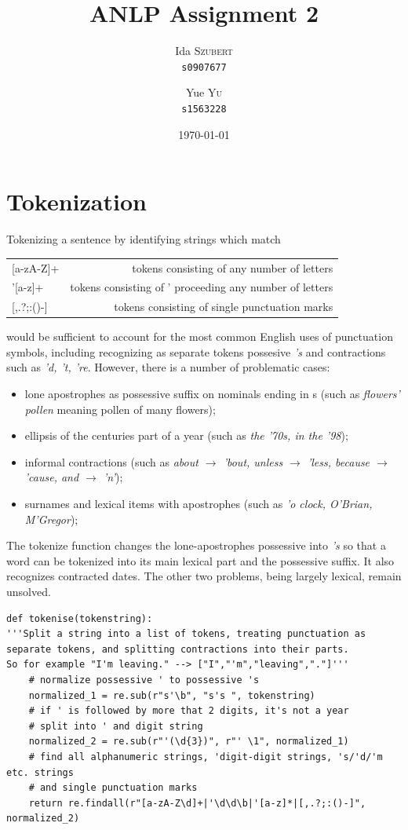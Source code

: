 \documentclass{article}
\title{ANLP Assignment 2} %
\author{
	Ida \textsc{Szubert}\\
	\texttt{s0907677}
	\and
	Yue \textsc{Yu}\\
	\texttt{s1563228}
}
\date{\today} %
\begin{document}
\section{Tokenization}

Tokenizing a sentence by identifying strings which match

\begin{center}
\begin{tabular}{l r}
	{[}a-zA-Z{]}+&tokens consisting of any number of letters\\
	'[a-z]+&tokens consisting of ' proceeding any number of letters\\
	{[},.?;:()-{]}&tokens consisting of single punctuation marks\\
\end{tabular}
\end{center}
would be sufficient to account for the most common English uses of punctuation symbols, including recognizing as separate tokens possesive \emph{'s} and contractions such as \emph{'d, 't, 're}.  However, there is a number of problematic cases:

\begin{itemize}
	\item
	lone apostrophes as possessive suffix on nominals ending in s (such as \emph{flowers' pollen} meaning pollen of many flowers);
	\item
	ellipsis of the centuries part of a year (such as \emph{the '70s, in the '98});
	\item
	informal contractions (such as \emph{about $\rightarrow$ 'bout, unless $\rightarrow$  ’less, because $\rightarrow$  'cause, and $\rightarrow$ 'n'});
	\item
	surnames and lexical items with apostrophes (such as \emph{'o clock, O'Brian, M'Gregor});
\end{itemize}
The tokenize function changes the lone-apostrophes possessive into \emph{'s} so that a word can be tokenized into its main lexical part and the possessive suffix. It also recognizes contracted dates. The other two problems, being largely lexical, remain unsolved.

\begin{lstlisting}
def tokenise(tokenstring):
'''Split a string into a list of tokens, treating punctuation as
separate tokens, and splitting contractions into their parts.
So for example "I'm leaving." --> ["I","'m","leaving","."]'''
	# normalize possessive ' to possessive 's
	normalized_1 = re.sub(r"s'\b", "s's ", tokenstring)
	# if ' is followed by more that 2 digits, it's not a year
	# split into ' and digit string
	normalized_2 = re.sub(r"'(\d{3})", r"' \1", normalized_1)
	# find all alphanumeric strings, 'digit-digit strings, 's/'d/'m etc. strings
	# and single punctuation marks
	return re.findall(r"[a-zA-Z\d]+|'\d\d\b|'[a-z]*|[,.?;:()-]", normalized_2)
\end{lstlisting}
\end{document}
